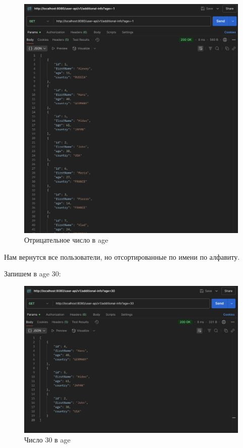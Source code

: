 \documentclass[a4paper, 14pt]{article}
\begin{document}
\begin{figure}[H]
	\centering
	\includegraphics[width=15cm]{resources/11.png}
	\caption{Отрицательное число в age}
\end{figure}

Нам вернутся все пользователи, но отсортированные по имени по алфавиту.

Запишем в age 30:

\begin{figure}[H]
	\centering
	\includegraphics[width=15cm]{resources/12.png}
	\caption{Число 30 в age}
\end{figure}
\end{document}
